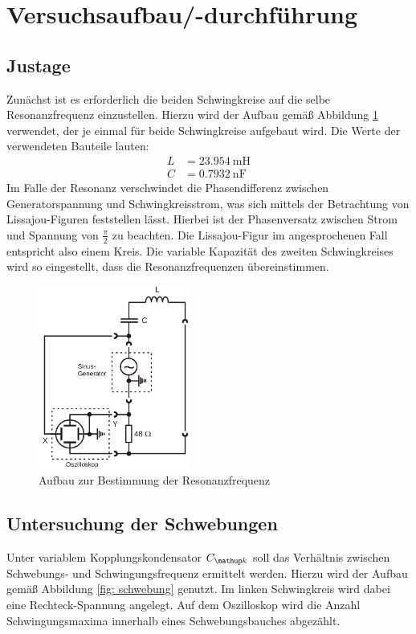 \section{Versuchsaufbau/-durchführung}
\subsection{Justage}
Zunächst ist es erforderlich die beiden Schwingkreise auf die selbe Resonanzfrequenz einzustellen.
Hierzu wird der Aufbau gemäß Abbildung \ref{fig: resonanzfrequenz} verwendet, der je einmal
für beide Schwingkreise aufgebaut wird. Die Werte der verwendeten Bauteile lauten:
\begin{align}
  L &= \SI{23.954}{\milli\henry} \\
  C &= \SI{0.7932}{\nano\farad}
  \label{eq: bauteile}
\end{align}
Im Falle der Resonanz verschwindet die Phasendifferenz
zwischen Generatorspannung und Schwingkreisstrom, was sich mittels der Betrachtung von Lissajou-Figuren
feststellen lässt. Hierbei ist der Phasenversatz zwischen Strom und Spannung von $\frac{\pi}{2}$
zu beachten. Die Lissajou-Figur im angesprochenen Fall entspricht also einem Kreis.
Die variable Kapazität des zweiten Schwingkreises wird so eingestellt, dass
die Resonanzfrequenzen übereinstimmen.
\begin{figure}
  \centering
  \includegraphics[width = 5cm]{pics/aufbau_resonanzfrequenz.png}
  \caption{Aufbau zur Bestimmung der Resonanzfrequenz \cite{anleitung355}}
  \label{fig: resonanzfrequenz}
\end{figure}

\subsection{Untersuchung der Schwebungen}
Unter variablem Kopplungskondensator $C\ua{k}$ soll das Verhältnis zwischen Schwebungs- und Schwingungsfrequenz ermittelt werden.
Hierzu wird der Aufbau gemäß Abbildung \ref{fig: schwebung} genutzt. Im linken Schwingkreis wird dabei eine Rechteck-Spannung
angelegt. Auf dem Oszilloskop wird die Anzahl Schwingungsmaxima innerhalb eines Schwebungsbauches abgezählt.

